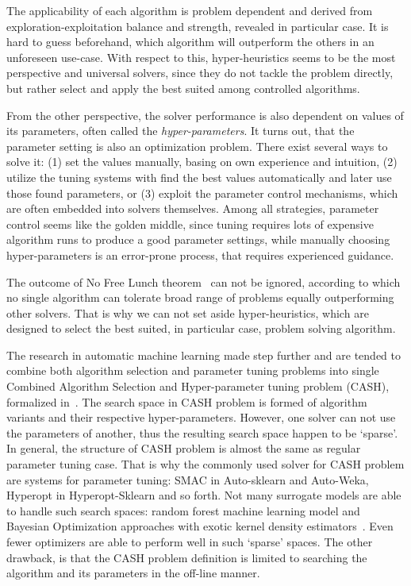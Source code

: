 The applicability of each algorithm is problem dependent and derived from exploration-exploitation balance and strength, revealed in particular case.
It is hard to guess beforehand, which algorithm will outperform the others in an unforeseen use-case.
With respect to this, hyper-heuristics seems to be the most perspective and universal solvers, since they do not tackle the problem directly, but rather select and apply the best suited among controlled algorithms.

From the other perspective, the solver performance is also dependent on values of its parameters, often called the \textit{hyper-parameters}.
It turns out, that the parameter setting is also an optimization problem.
There exist several ways to solve it: (1) set the values manually, basing on own experience and intuition, (2) utilize the tuning systems with find the best values automatically and later use those found parameters, or (3) exploit the parameter control mechanisms, which are often embedded into solvers themselves. 
Among all strategies, parameter control seems like the golden middle, since tuning requires lots of expensive algorithm runs to produce a good parameter settings, while manually choosing hyper-parameters is an error-prone process, that requires experienced guidance.

The outcome of No Free Lunch theorem~\cite{wolpert1997no} can not be ignored, according to which no single algorithm can tolerate broad range of problems equally outperforming other solvers. That is why we can not set aside hyper-heuristics, which are designed to select the best suited, in particular case, problem solving algorithm.

The research in automatic machine learning made step further and are tended to combine both algorithm selection and parameter tuning problems into single Combined Algorithm Selection and Hyper-parameter tuning problem (CASH), formalized in~\cite{thornton2013auto}. The search space in CASH problem is formed of algorithm variants and their respective hyper-parameters. However, one solver can not use the parameters of another, thus the resulting search space happen to be `sparse'. In general, the structure of CASH problem is almost the same as regular parameter tuning case. That is why the commonly used solver for CASH problem are systems for parameter tuning: SMAC in Auto-sklearn and Auto-Weka, Hyperopt in Hyperopt-Sklearn and so forth.
Not many surrogate models are able to handle such search spaces: random forest machine learning model and Bayesian Optimization approaches with exotic kernel density estimators~\cite{levesque2017bayesian}. Even fewer optimizers are able to perform well in such `sparse' spaces.
The other drawback, is that the CASH problem definition is limited to searching the algorithm and its parameters in the off-line manner.


